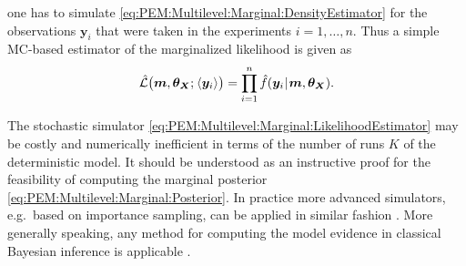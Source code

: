 one has to simulate \cref{eq:PEM:Multilevel:Marginal:DensityEstimator} for the observations \(\bm{y}_i\) that were taken in the experiments \(i=1,\ldots,n\).
Thus a simple MC-based estimator of the marginalized likelihood is given as
\begin{equation} \label{eq:PEM:Multilevel:Marginal:LikelihoodEstimator}
  \hat{\mathcal{L}} \big( \bm{m},\bm{\theta}_{\bm{X}} ;{\:\!} \langle{\bm{y}_i}\rangle \big)
  = \prod\limits_{i=1}^n \hat{f} (\bm{y}_i {\:\!}|{\:\!} \bm{m},\bm{\theta}_{\bm{X}}).
\end{equation}
\par %
The stochastic simulator \cref{eq:PEM:Multilevel:Marginal:LikelihoodEstimator} may be costly and numerically inefficient in terms of the number of runs \(K\) of the deterministic model.
It should be understood as an instructive proof for the feasibility of computing the marginal posterior \cref{eq:PEM:Multilevel:Marginal:Posterior}.
In practice more advanced simulators, e.g.\ based on importance sampling, can be applied in similar fashion \cite{MCMC:Beaumont2003,MCMC:Sung2007}.
More generally speaking, any method for computing the model evidence in classical Bayesian inference is applicable \cite{Bayesian:Bos2002}.